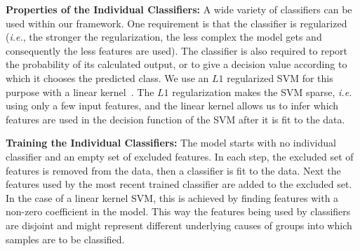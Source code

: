 \textbf{Properties of the Individual Classifiers:}
A wide variety of classifiers can be used within our framework. One requirement is that the classifier is regularized (\emph{i.e.}, the stronger the regularization, the less complex the model gets and consequently the less features are used). The classifier is also required to report the probability of its calculated output, or to give a decision value according to which it chooses the predicted class. We use an $L1$ regularized SVM for this purpose with a linear kernel~\cite{bradley1998feature}. The $L1$ regularization makes the SVM sparse, \emph{i.e.} using only a few input features, and the linear kernel allows us to infer which features are used in the decision function of the SVM after it is fit to the data.

\textbf{Training the Individual Classifiers:}
The model starts with no individual classifier and an empty set of excluded features. In each step, the excluded set of features is removed from the data, then a classifier is fit to the data. Next the features used by the most recent trained classifier are added to the excluded set. In the case of a linear kernel SVM, this is achieved by finding features with a non-zero coefficient in the model. This way the features being used by classifiers are disjoint and might represent different underlying causes of groups into which samples are to be classified.

